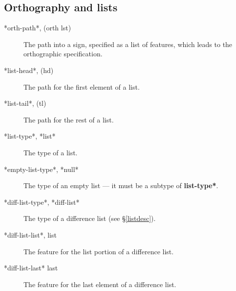\documentclass[12pt]{report}
\begin{document}
\subsection{Orthography and lists}
\label{olglob}
\begin{description}
\item [*orth-path*, (orth lst)]  The path into a sign, specified 
as a list of features, which leads to the orthographic specification.
\item[*list-head*, (hd)]  The path for the first element of a list.
\item[*list-tail*, (tl)] The path for the rest of a list.
\item[*list-type*, *list*] The type of a list.
\item[*empty-list-type*, *null*] The type of an empty list --- 
it must be a subtype of {\bf *list-type*}.
\item[*diff-list-type*, *diff-list*]  The type of a difference list (see
\S\ref{listdesc}).
\item[*diff-list-list*, list] The feature for the list portion
of a difference list.
\item[*diff-list-last* last] The feature for the last element of a difference list.
\end{description}
\end{document}
